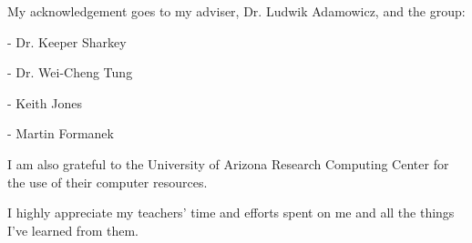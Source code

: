 My acknowledgement goes to my adviser, Dr. Ludwik Adamowicz, and the group:

- Dr. Keeper Sharkey

- Dr. Wei-Cheng Tung

- Keith Jones

- Martin Formanek

I am also grateful to the University of Arizona Research Computing Center 
for the use of their computer resources.

I highly appreciate my teachers' time and efforts spent on me 
and all the things I've learned from them.